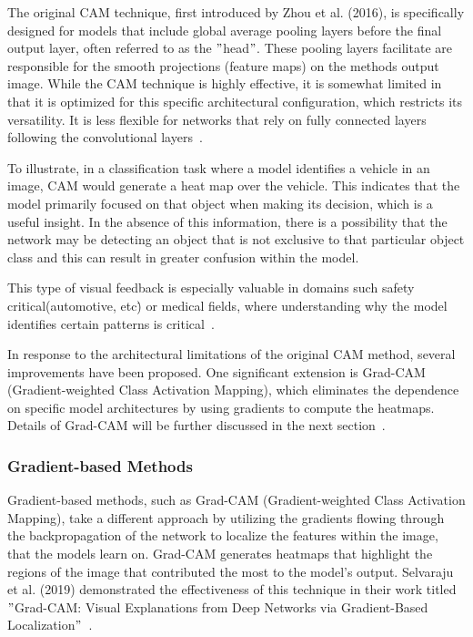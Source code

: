 The original CAM technique, first introduced by Zhou et al. (2016),
is specifically designed for models that include global average pooling layers before the final output layer,
often referred to as the \("\)head\("\).
These pooling layers facilitate are responsible for the smooth projections (feature maps) on the methods output image.
While the CAM technique is highly effective, it is somewhat limited in that it is optimized for this specific architectural
configuration, which restricts its versatility.
It is less flexible for networks that rely on fully connected layers following the convolutional layers~\cite{Zhou_2016}.

To illustrate, in a classification task where a model identifies a vehicle in an image, CAM would generate a heat map over the vehicle.
This indicates that the model primarily focused on that object when making its decision, which is a useful insight.
In the absence of this information, there is a possibility that the network may be detecting an object that is not
exclusive to that particular object class and this can result in greater confusion within the model.

This type of visual feedback is especially valuable in domains such safety critical(automotive, etc\. ) or medical fields,
where understanding why the model identifies certain patterns is critical~\cite{Muhammad_2020}.

In response to the architectural limitations of the original CAM method, several improvements have been proposed.
One significant extension is Grad-CAM (Gradient-weighted Class Activation Mapping), which eliminates the dependence
on specific model architectures by using gradients to compute the heatmaps.
Details of Grad-CAM will be further discussed in the next section~\cite{Selvaraju_2019}.

\subsubsection{Gradient-based Methods}\label{subsubsec:gradient-based-methods}

Gradient-based methods, such as Grad-CAM (Gradient-weighted Class Activation Mapping),
take a different approach by utilizing the gradients flowing through the backpropagation of
the network to localize the features within the image, that the models learn on.
Grad-CAM generates heatmaps that highlight the regions of the image that contributed the most to the model's output.
Selvaraju et al. (2019) demonstrated the effectiveness of this technique in their work titled
\("\)Grad-CAM: Visual Explanations from Deep Networks via Gradient-Based Localization\("\)~\cite{Selvaraju_2019}.

